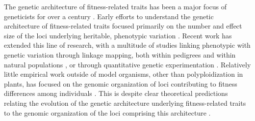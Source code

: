 \documentclass[smallextended]{svjour3}
\begin{document}
The genetic architecture of fitness-related traits has been a major focus of
geneticists for over a century \citep[reviewed by][]{Ellegren:2008}.  Early
efforts to understand the genetic architecture of fitness-related traits focused
primarily on the number and effect size of the loci underlying heritable,
phenotypic variation \citep{Fisher:1918}.  Recent work has extended this line of
research, with a multitude of studies linking phenotypic with genetic variation through
linkage mapping, both within pedigrees \citep{Mauricio:2001, Neale:2011,
  Ritland:2011} and within natural populations \citep{Ingvarsson:2011,
  Eckert:2013a}, or through quantitative genetic experimentation
\citep{Anderson:2013a, Anderson:2013b, Fournier-Level:2013}. Relatively little
empirical work outside of model organisms, other than polyploidization in
plants, has focused on the genomic organization of loci contributing to fitness
differences among individuals \citep[but see][]{Stevison:2011}. This is despite
clear theoretical predictions relating the evolution of the genetic architecture
underlying fitness-related traits to the genomic organization of the loci
comprising this architecture \citep{Kirkpatrick:2006, Yeaman:2011, Yeaman:2013,
  Akerman:2014}.
\end{document}

